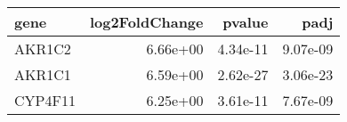 \begin{tabular}{lrrr}
\toprule
   gene &  log2FoldChange &   pvalue &     padj \\
\midrule
 AKR1C2 &        6.66e+00 & 4.34e-11 & 9.07e-09 \\
 AKR1C1 &        6.59e+00 & 2.62e-27 & 3.06e-23 \\
CYP4F11 &        6.25e+00 & 3.61e-11 & 7.67e-09 \\
\bottomrule
\end{tabular}
